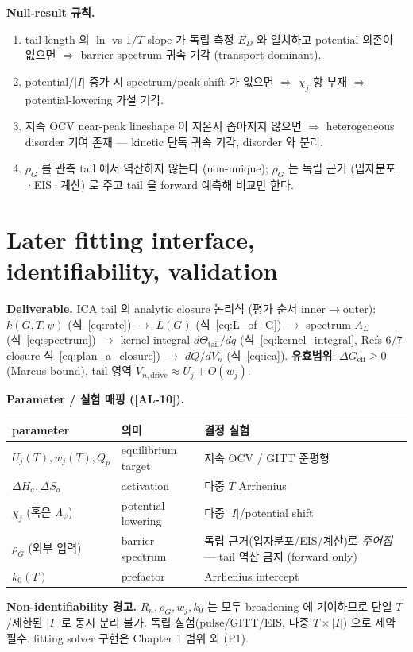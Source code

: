 \documentclass[11pt,a4paper]{article}
\newcommand{\eff}{\mathrm{eff}}
\newcommand{\dimedrive}{\mathrm{drive}}
\newcommand{\AL}[1]{\textsf{[AL-#1]}}
\begin{document}
\textbf{Null-result 규칙.}
\begin{enumerate}[label=(N\arabic*)]
\item tail length 의 $\ln$ vs $1/T$ slope 가 독립 측정 $E_D$ 와 일치하고 potential 의존이
  없으면 $\Rightarrow$ barrier-spectrum 귀속 기각 (transport-dominant).
\item potential/$|I|$ 증가 시 spectrum/peak shift 가 없으면 $\Rightarrow$ $\chi_j$ 항 부재
  $\Rightarrow$ potential-lowering 가설 기각.
\item 저속 OCV near-peak lineshape 이 저온서 좁아지지 않으면 $\Rightarrow$ heterogeneous
  disorder 기여 존재 — kinetic 단독 귀속 기각, disorder 와 분리.
\item $\rho_G$ 를 관측 tail 에서 역산하지 않는다 (non-unique); $\rho_G$ 는 독립 근거
  (입자분포·EIS·계산) 로 주고 tail 을 forward 예측해 비교만 한다.
\end{enumerate}

\section{Later fitting interface, identifiability, validation}\label{sec:fitting}
\textbf{Deliverable.} ICA tail 의 analytic closure 논리식 (평가 순서 inner$\to$outer):
$k(G,T,\psi)$ (식~\eqref{eq:rate}) $\to$ $L(G)$ (식~\eqref{eq:L_of_G}) $\to$ spectrum
$A_L$ (식~\eqref{eq:spectrum}) $\to$ kernel integral $d\Theta_\mathrm{tail}/dq$
(식~\eqref{eq:kernel_integral}, Refs 6/7 closure 식~\eqref{eq:plan_a_closure}) $\to$ $dQ/dV_n$
(식~\eqref{eq:ica}). \textbf{유효범위}: $\Delta G_\eff\ge0$ (Marcus bound), tail 영역
$V_{n,\dimedrive}\approx U_j+O(w_j)$.

\textbf{Parameter / 실험 매핑 (\AL{10}).}
\begin{longtable}{p{} p{} p{}}
\toprule parameter & 의미 & 결정 실험 \\ \midrule \endhead
$U_j(T),w_j(T),Q_p$ & equilibrium target & 저속 OCV / GITT 준평형 \\
$\Delta H_a,\Delta S_a$ & activation & 다중 $T$ Arrhenius \\
$\chi_j$ (혹은 $\Lambda_\psi$) & potential lowering & 다중 $|I|$/potential shift \\
$\rho_G$ (외부 입력) & barrier spectrum & 독립 근거(입자분포/EIS/계산)로 \emph{주어짐} — tail 역산 금지 (forward only) \\
$k_0(T)$ & prefactor & Arrhenius intercept \\
\bottomrule
\end{longtable}
\textbf{Non-identifiability 경고.} $R_n,\rho_G,w_j,k_0$ 는 모두 broadening 에 기여하므로
단일 $T$/제한된 $|I|$ 로 동시 분리 불가. 독립 실험(pulse/GITT/EIS, 다중 $T\times|I|$) 으로
제약 필수. fitting solver 구현은 Chapter 1 범위 외 (P1).
\end{document}
